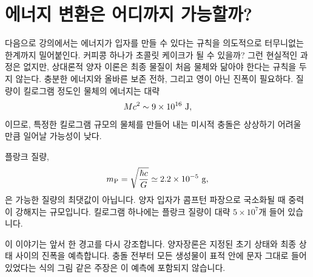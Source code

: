 \begin{classroomqa}
\end{classroomqa}

\section{에너지 변환은 어디까지 가능할까?}

다음으로 강의에서는 에너지가 입자를 만들 수 있다는 규칙을 의도적으로 터무니없는 한계까지 밀어붙인다. 커피콩 하나가 초콜릿 케이크가 될 수 있을까? 그런 현실적인 과정은 없지만, 상대론적 양자 이론은 최종 물질이 처음 물체와 닮아야 한다는 규칙을 두지 않는다. 충분한 에너지와 올바른 보존 전하, 그리고 영이 아닌 진폭이 필요하다. 질량이 킬로그램 정도인 물체의 에너지는 대략 \begin{equation}
  Mc^2\sim9\times10^{16}\ {\rm J},
\end{equation}이므로, 특정한 킬로그램 규모의 물체를 만들어 내는 미시적 충돌은 상상하기 어려울 만큼 일어날 가능성이 낮다.

플랑크 질량,
\begin{equation}
  m_{\rm P}=\sqrt{\frac{\hbar c}{G}}
  \simeq2.2\times10^{-5}\ {\rm g},
\end{equation}
은 가능한 질량의 최댓값이 아닙니다. 양자 입자가 콤프턴 파장으로 국소화될 때 중력이 강해지는 규모입니다. 킬로그램 하나에는 플랑크 질량이 대략 \(5\times10^7\)개 들어 있습니다.

\begin{classroomqa}
\end{classroomqa}

이 이야기는 앞서 한 경고를 다시 강조합니다. 양자장론은 지정된 초기 상태와 최종 상태 사이의 진폭을 예측합니다. 충돌 전부터 모든 생성물이 표적 안에 문자 그대로 들어 있었다는 식의 그림 같은 주장은 이 예측에 포함되지 않습니다.

